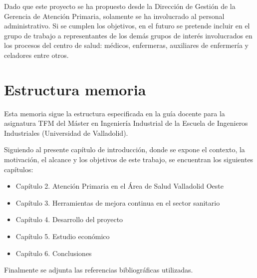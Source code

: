 Dado que este proyecto se ha propuesto desde la Dirección de Gestión de la Gerencia de Atención Primaria, solamente se ha involucrado al personal administrativo. Si se cumplen los objetivos, en el futuro se pretende incluir en el grupo de trabajo a representantes de los demás grupos de interés involucrados en los procesos del centro de salud: médicos, enfermeras, auxiliares de enfermería y celadores entre otros.

\section{Estructura memoria}

Esta memoria sigue la estructura especificada en la guía docente para la asignatura TFM del Máster en Ingeniería Industrial de la Escuela de Ingenieros Industriales (Universidad de Valladolid).

Siguiendo al presente capítulo de introducción, donde se expone el contexto, la motivación, el alcance y los objetivos de este trabajo, se encuentran los siguientes capítulos:

\begin{itemize}
    \item Capítulo 2. Atención Primaria en el Área de Salud Valladolid Oeste
    \item Capítulo 3. Herramientas de mejora continua en el sector sanitario
    \item Capítulo 4. Desarrollo del proyecto
    \item Capítulo 5. Estudio económico
    \item Capítulo 6. Conclusiones
\end{itemize}

Finalmente se adjunta las referencias bibliográficas utilizadas.
